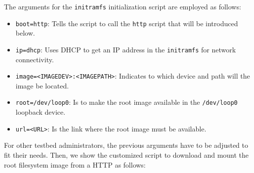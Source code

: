 The arguments for the \texttt{initramfs} initialization script are employed
as follows:
\begin{itemize}
    \item \texttt{boot=http}: Tells the script to call the \texttt{http}
    script that will be introduced below.
    \item \texttt{ip=dhcp}: Uses \ac{DHCP} to get an \ac{IP} address in
    the \texttt{initramfs} for network connectivity.
    \item \texttt{image=<IMAGEDEV>:<IMAGEPATH>}: Indicates to which device
    and path will the image be located.
    \item \texttt{root=/dev/loop0}: Is to make the root image available in
    the \texttt{/dev/loop0} loopback device.
    \item \texttt{url=<URL>}: Is the link where the root image must be
    available.
\end{itemize}


For other testbed administrators, the previous arguments have to be adjusted
to fit their needs. Then, we show the customized script to download and
mount the root filesystem image from a \ac{HTTP} as follows:

